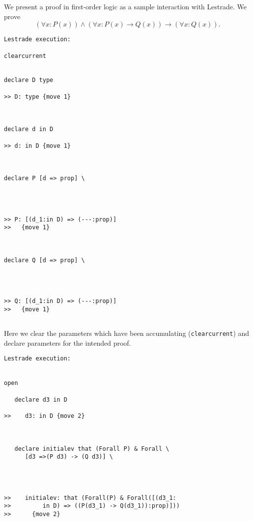 \documentclass{slides}
\begin{document}
\begin{slide}

We present a proof in first-order logic as a sample interaction with Lestrade.  We prove $$(\forall x:P(x)) \wedge (\forall x:P(x) \rightarrow Q(x)) \rightarrow (\forall x:Q(x)).$$

\end{slide}

\begin{slide}

{\tiny

\begin{verbatim}Lestrade execution:

clearcurrent


declare D type

>> D: type {move 1}



declare d in D

>> d: in D {move 1}



declare P [d => prop] \
   



>> P: [(d_1:in D) => (---:prop)]
>>   {move 1}



declare Q [d => prop] \
   



>> Q: [(d_1:in D) => (---:prop)]
>>   {move 1}


\end{verbatim}
}
\end{slide}
Here we clear the parameters which have been accumulating ({\tt clearcurrent}) and declare parameters for the intended proof.
\begin{slide}
\begin{verbatim}Lestrade execution:


open

   declare d3 in D

>>    d3: in D {move 2}



   declare initialev that (Forall P) & Forall \
      [d3 =>(P d3) -> (Q d3)] \
      



>>    initialev: that (Forall(P) & Forall([(d3_1:
>>         in D) => ((P(d3_1) -> Q(d3_1)):prop)]))
>>      {move 2}


\end{verbatim}

\end{slide}
\end{document}
